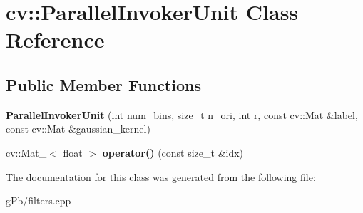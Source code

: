 \hypertarget{classcv_1_1_parallel_invoker_unit}{\section{cv\-:\-:Parallel\-Invoker\-Unit Class Reference}
\label{classcv_1_1_parallel_invoker_unit}
}
\subsection*{Public Member Functions}
\begin{DoxyCompactItemize}
\item 
\hypertarget{classcv_1_1_parallel_invoker_unit_ad79908823d73a42e594bd69e85a08d9f}{{\bfseries Parallel\-Invoker\-Unit} (int num\-\_\-bins, size\-\_\-t n\-\_\-ori, int r, const cv\-::\-Mat \&label, const cv\-::\-Mat \&gaussian\-\_\-kernel)}\label{classcv_1_1_parallel_invoker_unit_ad79908823d73a42e594bd69e85a08d9f}

\item 
\hypertarget{classcv_1_1_parallel_invoker_unit_a2b814687a03adf476d2864dde5a68602}{cv\-::\-Mat\-\_\-$<$ float $>$ {\bfseries operator()} (const size\-\_\-t \&idx)}\label{classcv_1_1_parallel_invoker_unit_a2b814687a03adf476d2864dde5a68602}

\end{DoxyCompactItemize}


The documentation for this class was generated from the following file\-:\begin{DoxyCompactItemize}
\item 
g\-Pb/filters.\-cpp\end{DoxyCompactItemize}
